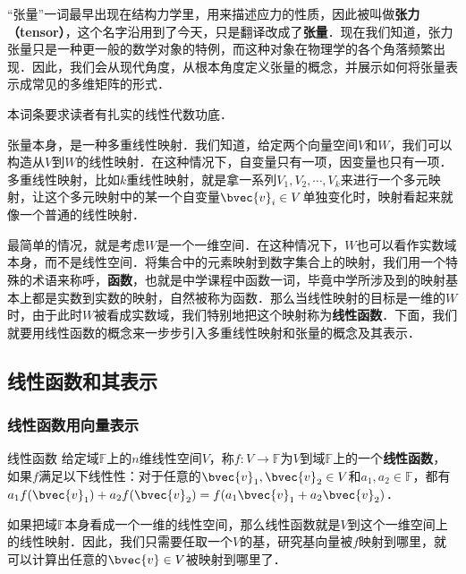 
“张量”一词最早出现在结构力学里，用来描述应力的性质，因此被叫做\textbf{张力（tensor）}，这个名字沿用到了今天，只是翻译改成了\textbf{张量}．现在我们知道，张力张量只是一种更一般的数学对象的特例，而这种对象在物理学的各个角落频繁出现．因此，我们会从现代角度，从根本角度定义张量的概念，并展示如何将张量表示成常见的多维矩阵的形式．

本词条要求读者有扎实的线性代数功底．




张量本身，是一种多重线性映射．我们知道，给定两个向量空间$V$和$W$，我们可以构造从$V$到$W$的线性映射．在这种情况下，自变量只有一项，因变量也只有一项．多重线性映射，比如$k$重线性映射，就是拿一系列$V_1, V_2, \cdots, V_k$来进行一个多元映射，让这个多元映射中的某一个自变量$\bvec{v}_i\in V$单独变化时，映射看起来就像一个普通的线性映射．

最简单的情况，就是考虑$W$是一个一维空间．在这种情况下，$W$也可以看作实数域本身，而不是线性空间．将集合中的元素映射到数字集合上的映射，我们用一个特殊的术语来称呼，\textbf{函数}，也就是中学课程中函数一词，毕竟中学所涉及到的映射基本上都是实数到实数的映射，自然被称为函数．那么当线性映射的目标是一维的$W$时，由于此时$W$被看成实数域，我们特别地把这个映射称为\textbf{线性函数}．下面，我们就要用线性函数的概念来一步步引入多重线性映射和张量的概念及其表示．

\subsection{线性函数和其表示}
\subsubsection{线性函数用向量表示}
\begin{definition}{线性函数}
给定域$\mathbb{F}$上的$n$维线性空间$V$，称$f:V\rightarrow \mathbb{F}$为$V$到域$\mathbb{F}$上的一个\textbf{线性函数}，如果$f$满足以下线性性：对于任意的$\bvec{v}_1, \bvec{v}_2\in V$和$a_1, a_2\in\mathbb{F}$，都有$a_1f(\bvec{v}_1)+a_2f(\bvec{v}_2)=f(a_1\bvec{v}_1+a_2\bvec{v}_2)$．
\end{definition}

如果把域$\mathbb{F}$本身看成一个一维的线性空间，那么线性函数就是$V$到这个一维空间上的线性映射．因此，我们只需要任取一个$V$的基，研究基向量被$f$映射到哪里，就可以计算出任意的$\bvec{v}\in V$被映射到哪里了．

